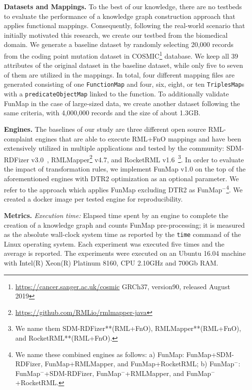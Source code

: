 \noindent\textbf{Datasets and Mappings.}
To the best of our knowledge, there are no testbeds to evaluate the performance of a knowledge graph construction approach that applies functional mappings. Consequently, following the real-world scenario that initially motivated this research, we create our testbed from the biomedical domain. We generate a baseline dataset by randomly selecting 20,000 records from the coding point mutation dataset in COSMIC\footnote{\url{https://cancer.sanger.ac.uk/cosmic} GRCh37, version90, released August 2019} database. We keep all 39 attributes of the original dataset in the baseline dataset, while only five to seven of them are utilized in the mappings. In total, four different mapping files are generated consisting of one \verb|FunctionMap| and four, six, eight, or ten \verb|TriplesMap|s with a \verb|predicateObjectMap| linked to the function. To additionally validate FunMap in the case of large-sized data, we create another dataset following the same criteria, with 4,000,000 records and the size of about 1.3GB.

\noindent\textbf{Engines.}
The baselines of our study are three different open source RML-complaint engines that are able to execute RML+FnO mappings and have been extensively utilized in multiple applications and tested by the community: SDM-RDFizer v3.0~\citep{iglesias2020sdm}, RMLMapper\footnote{\url{https://github.com/RMLio/rmlmapper-java}} v4.7, and RocketRML v1.6~\citep{csimcsek2019rocketrml}\footnote{We name them SDM-RDFizer**(RML+FnO), RMLMapper**(RML+FnO), and RocketRML**(RML+FnO).}. In order to evaluate the impact of transformation rules, we implement FunMap v1.0 on the top of the aforementioned engines with DTR2 optimization as an optional parameter. We refer to the approach which applies FunMap excluding DTR2 as FunMap$^-$\footnote{We name these combined engines as follows: a) FunMap: FunMap+SDM-RDFizer, FunMap+RMLMapper, and FunMap+RocketRML; b) FunMap$^-$: FunMap$^-$+SDM-RDFizer, FunMap$^-$+RMLMapper, and FunMap$^-$+RocketRML.}. We created a docker image per tested engine for reproducibility.  

\noindent\textbf{Metrics.} \textit{Execution time:} Elapsed time spent by an engine to complete the creation of a knowledge graph and counts FunMap pre-processing; it is measured as the absolute wall-clock system time as reported by the \verb|time| command of the Linux operating system. Each experiment was executed five times and the average is reported. The experiments were executed on an Ubuntu 16.04 machine with Intel(R) Xeon(R) Platinum 8160, CPU 2.10GHz and 700Gb RAM. 

